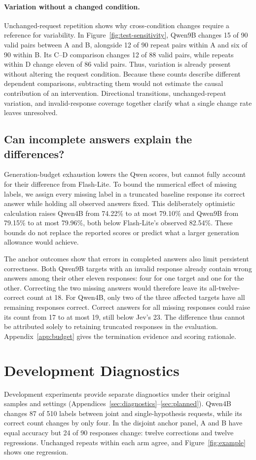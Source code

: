 \documentclass{article}
\begin{document}
\paragraph{Variation without a changed condition.}
Unchanged-request repetition shows why cross-condition changes require a reference for variability. In Figure~\ref{fig:test-sensitivity}, Qwen9B changes 15 of 90 valid pairs between A and B, alongside 12 of 90 repeat pairs within A and six of 90 within B. Its C--D comparison changes 12 of 88 valid pairs, while repeats within D change eleven of 86 valid pairs. Thus, variation is already present without altering the request condition. Because these counts describe different dependent comparisons, subtracting them would not estimate the causal contribution of an intervention. Directional transitions, unchanged-repeat variation, and invalid-response coverage together clarify what a single change rate leaves unresolved.

\subsection{Can incomplete answers explain the differences?}
Generation-budget exhaustion lowers the Qwen scores, but cannot fully account for their difference from Flash-Lite. To bound the numerical effect of missing labels, we assign every missing label in a truncated baseline response its correct answer while holding all observed answers fixed. This deliberately optimistic calculation raises Qwen4B from 74.22\% to at most 79.10\% and Qwen9B from 79.15\% to at most 79.96\%, both below Flash-Lite's observed 82.54\%. These bounds do not replace the reported scores or predict what a larger generation allowance would achieve.

The anchor outcomes show that errors in completed answers also limit persistent correctness. Both Qwen9B targets with an invalid response already contain wrong answers among their other eleven responses: four for one target and one for the other. Correcting the two missing answers would therefore leave its all-twelve-correct count at 18. For Qwen4B, only two of the three affected targets have all remaining responses correct. Correct answers for all missing responses could raise its count from 17 to at most 19, still below Jev's 23. The difference thus cannot be attributed solely to retaining truncated responses in the evaluation. Appendix~\ref{app:budget} gives the termination evidence and scoring rationale.

\section{Development Diagnostics}
\label{sec:development-overview}
Development experiments provide separate diagnostics under their original samples and settings (Appendices~\ref{sec:diagnostics}--\ref{sec:planned}). Qwen4B changes 87 of 510 labels between joint and single-hypothesis requests, while its correct count changes by only four. In the disjoint anchor panel, A and B have equal accuracy but 24 of 90 responses change: twelve corrections and twelve regressions. Unchanged repeats within each arm agree, and Figure~\ref{fig:example} shows one regression.
\end{document}
